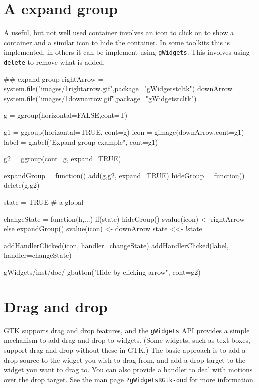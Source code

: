 \documentclass[12pt]{article}
\newcommand{\RCode}[1]{\texttt{#1}}
\begin{document}
\section{A expand group}
A useful, but not well used container involves an icon to click on to
show a container and a similar icon to hide the container. In some
toolkits this is implemented, in others it can be implement using
\RCode{gWidgets}. This involves using \RCode{delete} to remove what is added.
\begin{Scode}
  ## expand group
  rightArrow = system.file("images/1rightarrow.gif",package="gWidgetstcltk")
  downArrow = system.file("images/1downarrow.gif",package="gWidgetstcltk")


  g = ggroup(horizontal=FALSE,cont=T)
  
  g1 = ggroup(horizontal=TRUE, cont=g)
  icon = gimage(downArrow,cont=g1)
  label = glabel("Expand group example", cont=g1)
  
  g2 = ggroup(cont=g, expand=TRUE)
  
  expandGroup = function() add(g,g2, expand=TRUE)
  hideGroup = function() delete(g,g2)
  
  state = TRUE                            # a global
  
  changeState = function(h,...) {
    if(state) {
      hideGroup()
      svalue(icon) <- rightArrow
    }  else {
      expandGroup()
      svalue(icon) <- downArrow
    }
    state <<- !state
  }
  
  addHandlerClicked(icon, handler=changeState)
  addHandlerClicked(label, handler=changeState)
  
  gWidgets/inst/doc/
  gbutton("Hide by clicking arrow", cont=g2)
  
\end{Scode}



\section{Drag and drop}
GTK supports drag and drop features, and the \RCode{gWidgets} API provides a
simple mechanism to add drag and drop to widgets. (Some widgets, such
as text boxes, support drag and drop without these in GTK.) The basic
approach is to add a drop source to the widget you wish to drag from,
and add a drop target to the widget you want to drag to. You can also
provide a handler to deal with motions over the drop target. See the
man page \RCode{?gWidgetsRGtk-dnd} for more information.
\end{document}
